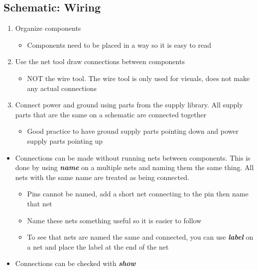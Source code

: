 \documentclass{article}
\begin{document}
\subsection{Schematic: Wiring}
\begin{enumerate}
    \item Organize components
    \begin{itemize}
        \item Components need to be placed in a way so it is easy to read
    \end{itemize}
    \item Use the net tool draw connections between components
    \begin{itemize}
        \item NOT the wire tool. The wire tool is only used for visuals, does not make any actual connections
    \end{itemize}
    \item Connect power and ground using parts from the supply library. All supply parts that are the same on a schematic are connected together
    \begin{itemize}
        \item Good practice to have ground supply parts pointing down and power supply parts pointing up
    \end{itemize}
\end{enumerate}
\begin{tcolorbox} [title=Tips \& Tricks]
    \begin{itemize}
        \item Connections can be made without running nets between components. This is done by using \textit{\textbf{name}} on a multiple nets and naming them the same thing. All nets with the same name are treated as being connected.
        \begin{itemize}
            \item Pins cannot be named, add a short net connecting to the pin then name that net
            \item Name these nets something useful so it is easier to follow
            \item To see that nets are named the same and connected, you can use \textit{\textbf{label}} on a net and place the label at the end of the net
        \end{itemize}
        \item Connections can be checked with \textit{\textbf{show}}
    \end{itemize}
\end{tcolorbox}
\end{document}
